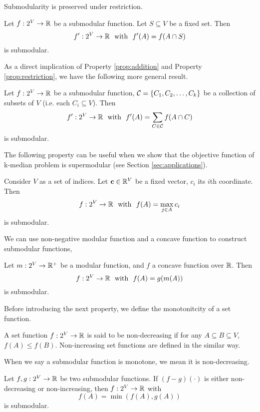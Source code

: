 Submodularity is preserved under restriction.
\begin{property}
  \label{prop:restriction}
  Let $f: 2^V \rightarrow \mathbb{R}$ be a submodular function. Let $S\subseteq V$ be a fixed set. Then
$$f':2^V \rightarrow \mathbb{R}~~\text{with}~~f'(A) = f(A\cap S)$$
is submodular.
\end{property}

As a direct implication of Property \ref{prop:addition} and Property \ref{prop:restriction}, we have the following more general result.
\begin{property}
Let $f:2^V \rightarrow \mathbb{R}$ be a submodular function, $\mathcal{C} = \{C_1, C_2, \ldots, C_k\}$ be a collection of subsets of $V$ (i.e. each $C_i \subseteq V$). Then
$$f':2^V \rightarrow \mathbb{R}~~\text{with}~~f'(A) = \sum_{C\in\mathcal{C}}f(A\cap C)$$ 
is submodular.
\end{property}


The following property can be useful when we show that the objective function of k-median problem is supermodular (see Section \ref{sec:applications}).
\begin{property}
  \label{prop:max}
Consider $V$ as a set of indices. Let $\mathbf{c}\in \mathbb{R}^V$ be a fixed vector, $c_i$ its $i$th coordinate. Then 
$$f:2^V \rightarrow \mathbb{R}~~\text{with}~~ f(A) = \max_{j\in A}c_i$$ 
is submodular.
\end{property}

We can use non-negative modular function and a concave function to construct submodular functions,
\begin{property}
  Let $m: 2^V \rightarrow \mathbb{R}^+$ be a modular function, and $f$ a concave function over $\mathbb{R}$. Then
$$f: 2^V \rightarrow \mathbb{R} ~~\text{with}~~ f(A) = g(m(A))$$
is submodular.
\end{property}

Before introducing the next property, we define the monotonitcity of a set function.
\begin{definition}[Monotonitcity]
  A set function $f: 2^V \rightarrow  \mathbb{R}$ is said to be non-decreasing if for any $A\subseteq B \subseteq V$, $f(A) \leq f(B)$. Non-increasing set functions are defined in the similar way.
\end{definition}
When we say a submodular function is monotone, we mean it is non-decreasing.

\begin{property}
  Let $f, g: 2^V \rightarrow \mathbb{R}$ be two submodular functions. If $(f - g)(\cdot)$ is either non-decreasing or non-increasing, then $f: 2^V \rightarrow \mathbb{R}$ with
$$f(A) = \min(f(A), g(A))$$
is submodular.
\end{property}



